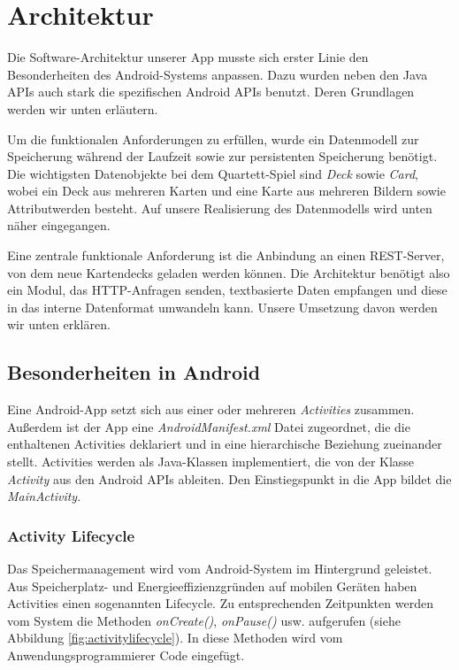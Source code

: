 \chapter{Architektur}
\label{cha:architektur}

Die Software-Architektur unserer App musste sich erster Linie den Besonderheiten des Android-Systems anpassen. Dazu wurden neben den Java APIs auch stark die spezifischen Android APIs benutzt. Deren Grundlagen werden wir unten erläutern.

Um die funktionalen Anforderungen zu erfüllen, wurde ein Datenmodell zur Speicherung während der Laufzeit sowie zur persistenten Speicherung benötigt. Die wichtigsten Datenobjekte bei dem Quartett-Spiel sind \emph{Deck} sowie \emph{Card}, wobei ein Deck aus mehreren Karten und eine Karte aus mehreren Bildern sowie Attributwerden besteht. Auf unsere Realisierung des Datenmodells wird unten näher eingegangen.

Eine zentrale funktionale Anforderung ist die Anbindung an einen REST-Server, von dem neue Kartendecks geladen werden können. Die Architektur benötigt also ein Modul, das HTTP-Anfragen senden, textbasierte Daten empfangen und diese in das interne Datenformat umwandeln kann. Unsere Umsetzung davon werden wir unten erklären.

\section{Besonderheiten in Android}
\label{sec:besonderheiten_android}

Eine Android-App setzt sich aus einer oder mehreren \emph{Activities} zusammen. Außerdem ist der App eine \emph{AndroidManifest.xml} Datei zugeordnet, die die enthaltenen Activities deklariert und in eine hierarchische Beziehung zueinander stellt. Activities werden als Java-Klassen implementiert, die von der Klasse \emph{Activity} aus den Android APIs ableiten. Den Einstiegspunkt in die App bildet die \emph{MainActivity}.

\subsection{Activity Lifecycle}

Das Speichermanagement wird vom Android-System im Hintergrund geleistet. Aus Speicherplatz- und Energieeffizienzgründen auf mobilen Geräten haben Activities einen sogenannten Lifecycle. Zu entsprechenden Zeitpunkten werden vom System die Methoden \emph{onCreate()}, \emph{onPause()} usw. aufgerufen (siehe Abbildung \ref{fig:activitylifecycle}). In diese Methoden wird vom Anwendungsprogrammierer Code eingefügt.

